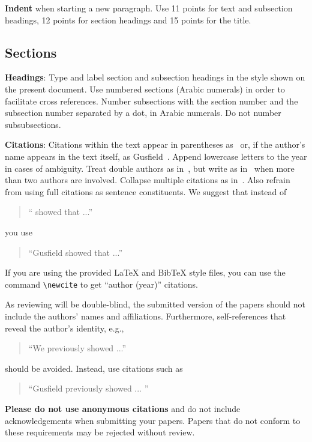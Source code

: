 \documentclass[11pt]{article}
\begin{document}
  {\bf Indent} when starting a new paragraph. Use 11 points for text and
subsection headings, 12 points for section headings and 15 points for
the title.

\subsection{Sections}

{\bf Headings}: Type and label section and subsection headings in the
style shown on the present document.  Use numbered sections (Arabic
numerals) in order to facilitate cross references. Number subsections
with the section number and the subsection number separated by a dot,
in Arabic numerals. Do not number subsubsections.

  {\bf Citations}: Citations within the text appear in parentheses
as~\cite{Gusfield:97} or, if the author's name appears in the text
itself, as Gusfield~.  Append lowercase letters
to the year in cases of ambiguity.  Treat double authors as
in~\cite{Aho:72}, but write as in~\cite{Chandra:81} when more than two
authors are involved. Collapse multiple citations as
in~\cite{Gusfield:97,Aho:72}. Also refrain from using full citations
as sentence constituents. We suggest that instead of
\begin{quote}
  ``\cite{Gusfield:97} showed that ...''
\end{quote}
you use
\begin{quote}
  ``Gusfield    showed that ...''
\end{quote}

If you are using the provided \LaTeX{} and Bib\TeX{} style files, you
can use the command \verb|\newcite| to get ``author (year)'' citations.

As reviewing will be double-blind, the submitted version of the papers
should not include the authors' names and affiliations. Furthermore,
self-references that reveal the author's identity, e.g.,
\begin{quote}
  ``We previously showed \cite{Gusfield:97} ...''
\end{quote}
should be avoided. Instead, use citations such as
\begin{quote}
  ``Gusfield 
  previously showed ... ''
\end{quote}

\textbf{Please do not use anonymous citations} and do not include
acknowledgements when submitting your papers. Papers that do not
conform to these requirements may be rejected without review.
\end{document}
